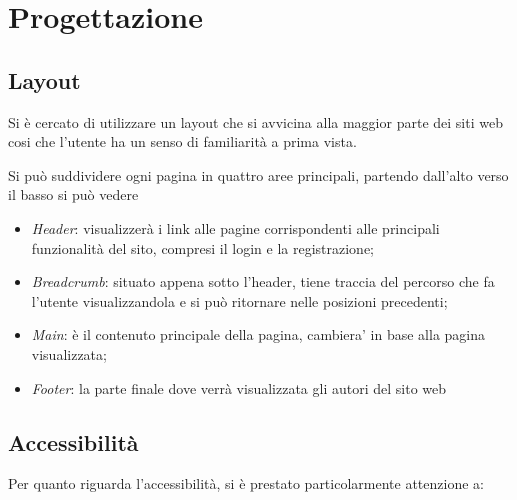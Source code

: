 \section{Progettazione}

\subsection{Layout}

Si è cercato di utilizzare un layout che si avvicina alla maggior parte dei 
siti web cosi che l'utente ha un senso di familiarità a prima vista.

Si può suddividere ogni pagina in quattro aree principali, 
partendo dall'alto verso il basso si può vedere

\begin{itemize}
	\item \textit{Header}:  visualizzerà i link alle pagine
	corrispondenti alle principali funzionalità del sito, compresi il login e la registrazione;
	\item \textit{Breadcrumb}: situato appena sotto l'header, tiene traccia del 
	percorso che fa l'utente visualizzandola e si può ritornare nelle posizioni precedenti;
	\item \textit{Main}: è il contenuto principale della pagina, cambiera' in base alla pagina visualizzata;
	\item \textit{Footer}: la parte finale dove verrà visualizzata gli autori del sito web
\end{itemize}


\subsection{Accessibilità}

Per quanto riguarda l'accessibilità, si è prestato particolarmente attenzione a:

